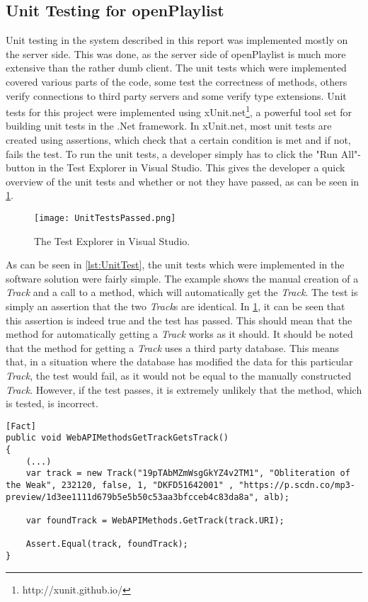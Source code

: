 \subsection{Unit Testing for openPlaylist}
Unit testing in the system described in this report was implemented mostly on the server side. This was done, as the server side of openPlaylist is much more extensive than the rather dumb client.
The unit tests which were implemented covered various parts of the code, some test the correctness of methods, others verify connections to third party servers and some verify type extensions.
Unit tests for this project were implemented using xUnit.net\footnote{http://xunit.github.io/}, a powerful tool set for building unit tests in the .Net framework. In xUnit.net, most unit tests are created using assertions, which check that a certain condition is met and if not, fails the test.
To run the unit tests, a developer simply has to click the "Run All"-button in the Test Explorer in Visual Studio. This gives the developer a quick overview of the unit tests and whether or not they have passed, as can be seen in \cref{fig:UnitTestsPassed}.
\begin{figure}[H]
  \centering
  \texttt{[image: UnitTestsPassed.png]}
  \caption{The Test Explorer in Visual Studio.}\label{fig:UnitTestsPassed}
\end{figure}

As can be seen in \cref{lst:UnitTest}, the unit tests which were implemented in the software solution were fairly simple. The example shows the manual creation of a \emph{Track} and a call to a method, which will automatically get the \emph{Track}. The test is simply an assertion that the two \emph{Track}s are identical. In \cref{fig:UnitTestsPassed}, it can be seen that this assertion is indeed true and the test has passed. This should mean that the method for automatically getting a \emph{Track} works as it should. 
It should be noted that the method for getting a \emph{Track} uses a third party database. This means that, in a situation where the database has modified the data for this particular \emph{Track}, the test would fail, as it would not be equal to the manually constructed \emph{Track}. However, if the test passes, it is extremely unlikely that the method, which is tested, is incorrect.

\begin{lstlisting}[float, floatplacement=htpb,caption = {Test method for the automatic getting of a \textbf{Track}}, label = {lst:UnitTest}]
[Fact]
public void WebAPIMethodsGetTrackGetsTrack()
{
	(...)
	var track = new Track("19pTAbMZmWsgGkYZ4v2TM1", "Obliteration of the Weak", 232120, false, 1, "DKFD51642001" , "https://p.scdn.co/mp3-preview/1d3ee1111d679b5e5b50c53aa3bfcceb4c83da8a", alb);

	var foundTrack = WebAPIMethods.GetTrack(track.URI);

	Assert.Equal(track, foundTrack);
}
\end{lstlisting}
